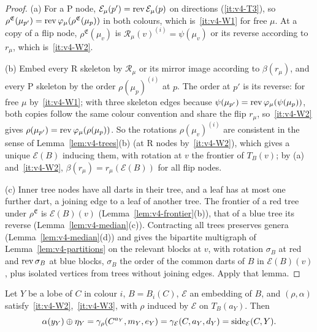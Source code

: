 \begin{proof}
(a) For a P node, $\mathcal E_\mu(p')=\operatorname{rev}\mathcal E_\mu(p)$ on directions
(\ref{it:v4-T3}), so $\rho^{\mathfrak E}(\mu_{p'})=\operatorname{rev}\varphi_\mu
(\rho^{\mathfrak E}(\mu_p))$ in both colours, which is~\ref{it:v4-W1} for free
$\mu$. At a copy of a flip node, $\rho^{\mathfrak E}(\mu_v)$ is $\mathcal
R_\mu(v)^{(i)}=\psi(\mu_v)$ or its reverse according to $r_\mu$,
which is~\ref{it:v4-W2}.

(b) Embed every R skeleton by $\mathcal R_\mu$ or its mirror image according
to $\beta(r_\mu)$, and every P skeleton by the order $\rho(\mu_p)^{(i)}$ at
$p$. The order at $p'$ is its reverse: for free $\mu$ by~\ref{it:v4-W1}; with
three skeleton edges because $\psi(\mu_{p'})=\operatorname{rev}\varphi_\mu(\psi(\mu_p))$,
both copies follow the same colour convention and share the flip $r_\mu$,
so~\ref{it:v4-W2} gives $\rho(\mu_{p'})=\operatorname{rev}\varphi_\mu(\rho(\mu_p))$.
So the rotations $\rho(\mu_v)^{(i)}$ are consistent in the sense of
Lemma~\ref{lem:v4-trees}(b) (at R nodes by~\ref{it:v4-W2}), which gives a
unique $\mathcal E(B)$ inducing them, with rotation at $v$ the frontier of $T_B(v)$; by (a)
and~\ref{it:v4-W2}, $\beta(r_\mu)=r_\mu(\mathcal E(B))$ for all flip nodes.

(c) Inner tree nodes have all darts in their tree, and a leaf has at most one
further dart, a joining edge to a leaf of another tree. The frontier of a red tree under
$\rho^{\mathfrak E}$ is $\mathcal E(B)(v)$ (Lemma~\ref{lem:v4-frontier}(b)),
that of a blue tree its reverse (Lemma~\ref{lem:v4-median}(c)). Contracting
all trees preserves genera (Lemma~\ref{lem:v4-median}(d)) and gives the
bipartite multigraph of Lemma~\ref{lem:v4-partitions} on the relevant blocks
at $v$, with rotation $\sigma_B$ at red and $\operatorname{rev}\sigma_B$ at blue blocks,
$\sigma_B$ the order of the common darts of $B$ in $\mathcal E(B)(v)$, plus
isolated vertices from trees without joining edges. Apply that lemma.
\end{proof}

\begin{lemma}\label{lem:v4-readval}
Let $Y$ be a lobe of $C$ in colour $i$, $B=B_i(C)$, $\mathcal E$ an embedding
of $B$, and $(\rho,\alpha)$ satisfy~\ref{it:v4-W2},~\ref{it:v4-W3}, with
$\rho$ induced by $\mathcal E$ on $T_B(a_Y)$. Then
\[
\alpha(y_Y)\oplus\eta_Y=\gamma_\rho(C^{a_Y},m_Y,e_Y)
=\gamma_{\mathcal E}(C,a_Y,d_Y)=\operatorname{side}_{\mathcal E}(C,Y).
\]
\end{lemma}

